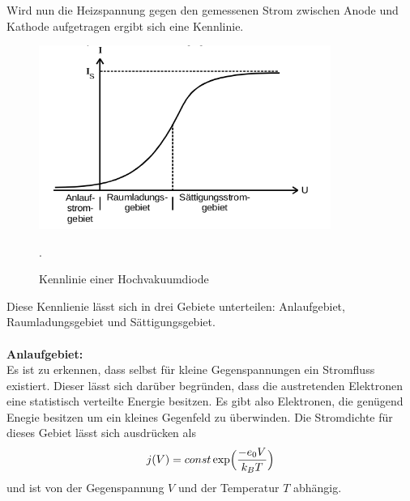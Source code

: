 Wird nun die Heizspannung gegen den gemessenen Strom zwischen Anode und Kathode aufgetragen
ergibt sich eine Kennlinie.

\begin{figure}[H]
  \centering
  \includegraphics[height=6cm]{Kennlinie.png}
  \caption{Kennlinie einer Hochvakuumdiode}
  \label{fig:kenn}
  \cite{skript}.
\end{figure}

Diese Kennlienie lässt sich in drei Gebiete unterteilen: Anlaufgebiet, Raumladungsgebiet und
Sättigungsgebiet.\\
\\
\textbf{Anlaufgebiet:}\\
Es ist zu erkennen, dass selbst für kleine Gegenspannungen ein Stromfluss existiert.
Dieser lässt sich darüber begründen, dass die austretenden Elektronen eine statistisch
verteilte Energie besitzen. Es gibt also Elektronen, die genügend Enegie besitzen
um ein kleines Gegenfeld zu überwinden. Die Stromdichte für dieses Gebiet lässt sich
ausdrücken als
\begin{equation}
  j(V)=const\exp\Bigl({\frac{-e_{0}V}{k_{B}T}}\Bigr)
  \label{eqn:anlauf}
\end{equation}
und ist von der Gegenspannung $V$ und der Temperatur $T$ abhängig.
\\

